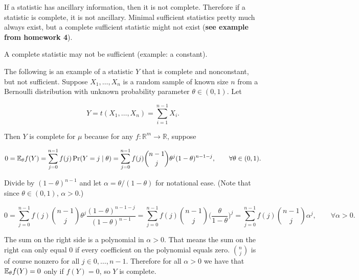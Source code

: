 \begin{remark} If a statistic has ancillary information, then it is not complete. Therefore if a statistic is complete, it is not ancillary. Minimal sufficient statistics pretty much always exist, but a complete sufficient statistic might not exist (\textbf{see example from homework 4}).
\end{remark}

\begin{remark}A complete statistic may not be sufficient (example: a constant).

\end{remark}

\begin{example} The following is an example of a statistic \(Y\) that is complete and nonconstant, but not sufficient. Suppose \(X_1, \ldots, X_n\) is a random sample of known size \(n\) from a Bernoulli distribution with unknown probability parameter \(\theta \in (0,1)\). Let

\[
Y = t(X_1, \ldots, X_n) =  \sum_{i=1}^{n-1} X_i.
\]

Then \(Y\) is complete for \(\mu\) because for any \(f: \mathbb{R}^m \to \mathbb{R}\), suppose


\[
0 = \E_\theta f(Y)  = \sum_{j=0}^{n-1} f(j)\Pr(Y = j \mid \theta) = \sum_{j=0}^{n-1} f(j) \binom{n-1}{j} \theta^j(1 - \theta)^{n-1-j}, \qquad \forall \theta \in (0,1).
\]

%
%

Divide by \((1-\theta)^{n-1}\) and let \(\alpha = \theta/(1-\theta)\) for notational ease. (Note that since \(\theta \in (0,1)\), \(\alpha > 0\).)

\[
0 = \sum_{j=0}^{n-1} f(j) \binom{n-1}{j} \theta^j \frac{(1 - \theta)^{n-1-j} }{(1 - \theta)^{n-1}} = \sum_{j=0}^{n-1} f(j) \binom{n-1}{j} \bigg( \frac{\theta}{1-\theta} \bigg) ^j  = \sum_{j=0}^{n-1} f(j) \binom{n-1}{j} \alpha ^j    , \qquad \forall \alpha > 0.
\]


The sum on the right side is a polynomial in \(\alpha > 0\). That means the sum on the right can only equal 0 if every coefficient on the polynomial equals zero. \(\binom{n}{j}\) is of course nonzero for all \(j \in 0, \ldots, n-1\). Therefore for all \(\alpha > 0\) we have that \(\E_\theta f(Y) = 0\) only if \(f(Y) = 0\), so \(Y\) is complete.


\end{example}
